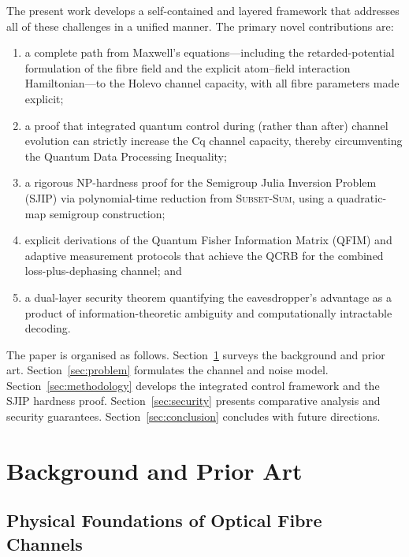 \documentclass[journal,twocolumn]{IEEEtran}
\theoremstyle{definition}
\theoremstyle{plain}
\begin{document}
The present work develops a self-contained and layered framework
that addresses all of these challenges in a unified manner.
The primary novel contributions are:
\begin{enumerate}[leftmargin=*, label=(\roman*), itemsep=2pt]
  \item a complete path from Maxwell's equations---including the
        retarded-potential formulation of the fibre field and the
        explicit atom--field interaction Hamiltonian---to the Holevo
        channel capacity, with all fibre parameters made explicit;
  \item a proof that integrated quantum control during (rather than
        after) channel evolution can strictly increase the Cq
        channel capacity, thereby circumventing the Quantum Data
        Processing Inequality;
  \item a rigorous NP-hardness proof for the Semigroup Julia
        Inversion Problem (SJIP) via polynomial-time reduction from
        \textsc{Subset-Sum}, using a quadratic-map semigroup
        construction;
  \item explicit derivations of the Quantum Fisher Information
        Matrix (QFIM) and adaptive measurement protocols that
        achieve the QCRB for the combined loss-plus-dephasing
        channel; and
  \item a dual-layer security theorem quantifying the eavesdropper's
        advantage as a product of information-theoretic ambiguity
        and computationally intractable decoding.
\end{enumerate}

The paper is organised as follows.  Section~\ref{sec:background}
surveys the background and prior art.  Section~\ref{sec:problem}
formulates the channel and noise model.
Section~\ref{sec:methodology} develops the integrated control
framework and the SJIP hardness proof.
Section~\ref{sec:security} presents comparative analysis and
security guarantees.  Section~\ref{sec:conclusion} concludes with
future directions.

\section{Background and Prior Art}
\label{sec:background}

\subsection{Physical Foundations of Optical Fibre Channels}
\end{document}
